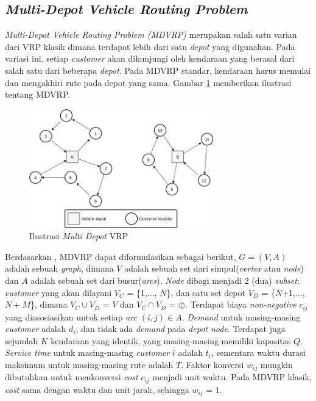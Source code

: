 \subsection{\textit{Multi-Depot Vehicle Routing Problem}}
\label{ssec:mdvrp}
\textit{Multi-Depot Vehicle Routing Problem (MDVRP)} merupakan salah satu varian dari VRP klasik dimana terdapat lebih dari satu \textit{depot} yang digunakan. Pada variasi ini, setiap \textit{customer} akan dikunjungi oleh kendaraan yang berasal dari salah satu dari beberapa \textit{depot}. Pada MDVRP standar, kendaraan harus memulai dan mengakhiri rute pada depot yang sama. Gambar \ref{fig:mdvrp-illustration} memberikan ilustrasi tentang MDVRP.


\begin{figure}[!]
	\centering
	\includegraphics[width=8cm]{Resources/Images/mdvrp-illustration}
	\caption{Ilustrasi \textit{Multi Depot} VRP}
	\label{fig:mdvrp-illustration}
\end{figure}


Berdasarkan \citep{renaud_tabu_1996}, MDVRP dapat diformulasikan sebagai berikut, $G = (V, A)$ adalah sebuah \textit{graph}, dimana $V$ adalah sebuah set dari simpul(\textit{vertex} atau \textit{node}) dan $A$ adalah sebuah set dari busur(\textit{arcs}). \textit{Node} dibagi menjadi 2 (dua) \textit{subset}: \textit{customer} yang akan dilayani $V_C$ = \{1,..., $N$\}, dan satu set depot $V_D$ = \{$N$+1,..., $N+M$\}, dimana $V_C \cup V_D$ = $V$ dan $V_C \cap V_D$ = $\oslash$. Terdapat biaya \textit{non-negative} $c_{ij}$ yang diasosiasikan untuk setiap \textit{arc} $(i, j) \in A$. \textit{Demand} untuk masing-masing \textit{customer} adalah $d_i$, dan tidak ada \textit{demand} pada \textit{depot node}. Terdapat juga sejumlah $K$ kendaraan yang identik, yang masing-masing memiliki kapasitas $Q$. \textit{Service time} untuk masing-masing \textit{customer} $i$ adalah $t_i$, sementara waktu durasi maksimum untuk masing-masing rute adalah $T$. Faktor konversi $w_{ij}$ mungkin dibutuhkan untuk menkonversi \textit{cost} $c_{ij}$ menjadi unit waktu. Pada MDVRP klasik, \textit{cost} sama dengan waktu dan unit jarak, sehingga $w_{ij}$ = $1$.


